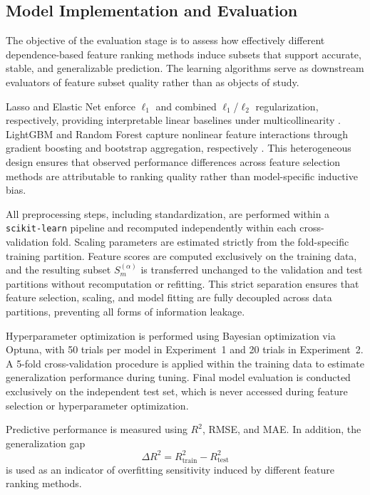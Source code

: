 \documentclass[twoside,11pt]{article}
\begin{document}
\subsection{Model Implementation and Evaluation}
The objective of the evaluation stage is to assess how effectively different
dependence-based feature ranking methods induce subsets that support accurate,
stable, and generalizable prediction. The learning algorithms serve as downstream
evaluators of feature subset quality rather than as objects of study.

Lasso \citep{Tibshirani1996lasso} and Elastic Net
\citep{ZouHastie2005elasticnet} enforce $\ell_1$ and combined $\ell_1$/$\ell_2$
regularization, respectively, providing interpretable linear baselines under
multicollinearity \citep{Hastie2019}. LightGBM \citep{Ke2017lightgbm} and
Random Forest \citep{Breiman2001rf} capture nonlinear feature interactions
through gradient boosting and bootstrap aggregation, respectively
\citep{Grinsztajn2022tree}. This heterogeneous design ensures that observed
performance differences across feature selection methods are attributable to
ranking quality rather than model-specific inductive bias.

All preprocessing steps, including standardization, are performed within a
\texttt{scikit-learn} pipeline and recomputed independently within each
cross-validation fold. Scaling parameters are estimated strictly from the
fold-specific training partition. Feature scores are computed exclusively on
the training data, and the resulting subset $S_m^{(\alpha)}$ is transferred
unchanged to the validation and test partitions without recomputation or
refitting. This strict separation ensures that feature selection, scaling, and
model fitting are fully decoupled across data partitions, preventing all forms
of information leakage.

Hyperparameter optimization is performed using Bayesian optimization via Optuna,
with 50 trials per model in Experiment~1 and 20 trials in Experiment~2. A
5-fold cross-validation procedure is applied within the training data to estimate
generalization performance during tuning. Final model evaluation is conducted
exclusively on the independent test set, which is never accessed during feature
selection or hyperparameter optimization.

Predictive performance is measured using $R^2$, RMSE, and MAE. In addition, the
generalization gap
\[
\Delta R^2 = R^2_{\text{train}} - R^2_{\text{test}}
\]
is used as an indicator of overfitting sensitivity induced by different feature
ranking methods.
\end{document}
